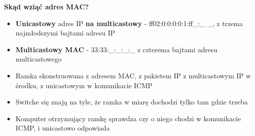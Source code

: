 \documentclass[main.tex]{subfiles}
\begin{document}
    \noindent \textbf{Skąd wziąć adres MAC?}
    \begin{itemize}[noitemsep]
        \item \textbf{Unicastowy} adres IP \textbf{na multicastowy} - ff02:0:0:0:0:1:ff\_:\_ \_,
        z trzema najmłodszymi bajtami adresu IP
        \item\textbf{Multicastowy MAC} - 33:33:\_:\_:\_:\_ z czterema bajtami adresu multicastowego
        \item Ramka skonstruowana z adresem MAC, z pakietem IP z multicastowym IP w środku, z unicastowym w komunikacie ICMP
        \item Switche się znają na tyle, że ramka w miarę dochodzi tylko tam gdzie trzeba
        \item Komputer otrzymujący ramkę sprawdza czy o niego chodzi w komunikacie ICMP, i unicastowo odpowiada
    \end{itemize}
\end{document}

